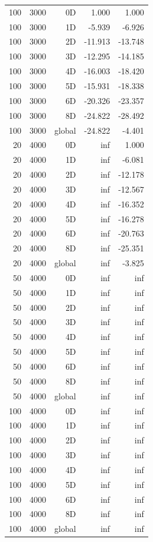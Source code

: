 \begin{longtable}{rrrrr}
100 & 3000 & 0D & 1.000 & 1.000 \\
100 & 3000 & 1D & -5.939 & -6.926 \\
100 & 3000 & 2D & -11.913 & -13.748 \\
100 & 3000 & 3D & -12.295 & -14.185 \\
100 & 3000 & 4D & -16.003 & -18.420 \\
100 & 3000 & 5D & -15.931 & -18.338 \\
100 & 3000 & 6D & -20.326 & -23.357 \\
100 & 3000 & 8D & -24.822 & -28.492 \\
100 & 3000 & global & -24.822 & -4.401 \\
20 & 4000 & 0D & inf & 1.000 \\
20 & 4000 & 1D & inf & -6.081 \\
20 & 4000 & 2D & inf & -12.178 \\
20 & 4000 & 3D & inf & -12.567 \\
20 & 4000 & 4D & inf & -16.352 \\
20 & 4000 & 5D & inf & -16.278 \\
20 & 4000 & 6D & inf & -20.763 \\
20 & 4000 & 8D & inf & -25.351 \\
20 & 4000 & global & inf & -3.825 \\
50 & 4000 & 0D & inf & inf \\
50 & 4000 & 1D & inf & inf \\
50 & 4000 & 2D & inf & inf \\
50 & 4000 & 3D & inf & inf \\
50 & 4000 & 4D & inf & inf \\
50 & 4000 & 5D & inf & inf \\
50 & 4000 & 6D & inf & inf \\
50 & 4000 & 8D & inf & inf \\
50 & 4000 & global & inf & inf \\
100 & 4000 & 0D & inf & inf \\
100 & 4000 & 1D & inf & inf \\
100 & 4000 & 2D & inf & inf \\
100 & 4000 & 3D & inf & inf \\
100 & 4000 & 4D & inf & inf \\
100 & 4000 & 5D & inf & inf \\
100 & 4000 & 6D & inf & inf \\
100 & 4000 & 8D & inf & inf \\
100 & 4000 & global & inf & inf \\
\end{longtable}
